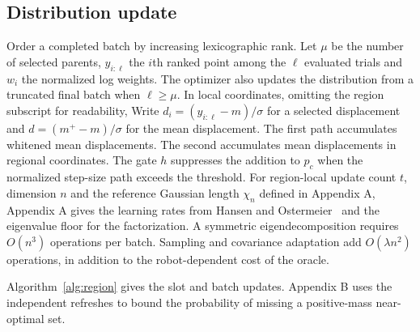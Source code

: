\subsection{Distribution update}
Order a completed batch by increasing lexicographic rank. Let $\mu$ be the number of selected parents, $y_{i:\ell}$ the $i$th ranked point among the $\ell$ evaluated trials and $w_i$ the normalized log weights. The optimizer also updates the distribution from a truncated final batch when $\ell\geq\mu$. In local coordinates, omitting the region subscript for readability,
Write $d_i=(y_{i:\ell}-m)/\sigma$ for a selected displacement and $d=(m^+-m)/\sigma$ for the mean displacement. The first path accumulates whitened mean displacements. The second accumulates mean displacements in regional coordinates.
The gate $h$ suppresses the addition to $p_c$ when the normalized step-size path exceeds the threshold. For region-local update count $t$, dimension $n$ and the reference Gaussian length $\chi_n$ defined in Appendix A,
Appendix A gives the learning rates from Hansen and Ostermeier~\cite{cma} and the eigenvalue floor for the factorization. A symmetric eigendecomposition requires $O(n^3)$ operations per batch. Sampling and covariance adaptation add $O(\lambda n^2)$ operations, in addition to the robot-dependent cost of the oracle.

Algorithm~\ref{alg:region} gives the slot and batch updates. Appendix B uses the independent refreshes to bound the probability of missing a positive-mass near-optimal set.

